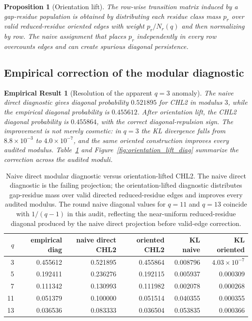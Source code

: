 \documentclass[10pt]{article}
\newtheorem{proposition}{Proposition}
\newtheorem{empirical}{Empirical Result}
\begin{document}
\begin{proposition}[Orientation lift]
The row-wise transition matrix induced by a gap-residue population is obtained by distributing each residue class mass $p_r$ over valid reduced-residue oriented edges with weight $p_r/N_r(q)$ and then normalizing by row.  The naive assignment that places $p_r$ independently in every row overcounts edges and can create spurious diagonal persistence.
\end{proposition}
\subsection{Empirical correction of the modular diagnostic}
\begin{empirical}[Resolution of the apparent $q=3$ anomaly]
The naive direct diagnostic gives diagonal probability $0.521895$ for CHL2 in modulus $3$, while the empirical diagonal probability is $0.455612$.  After orientation lift, the CHL2 diagonal probability is $0.455864$, with the correct diagonal-repulsion sign.  The improvement is not merely cosmetic: in $q=3$ the KL divergence falls from $8.8\times10^{-3}$ to $4.0\times10^{-7}$, and the same oriented construction improves every audited modulus.  Table~\ref{tab:orientation_lift_diag} and Figure~\ref{fig:orientation_lift_diag} summarize the correction across the audited moduli.
\end{empirical}

\begin{table}[H]\centering\small
\begin{tabular}{rrrrrr}
\toprule
$q$ & empirical diag & naive direct CHL2 & oriented CHL2 & KL naive & KL oriented \\
\midrule
3 & 0.455612 & 0.521895 & 0.455864 & 0.008796 & $4.03\times10^{-7}$ \\
5 & 0.192411 & 0.236276 & 0.192115 & 0.005937 & 0.000309 \\
7 & 0.111342 & 0.130993 & 0.111982 & 0.002078 & 0.000268 \\
11 & 0.051379 & 0.100000 & 0.051514 & 0.040355 & 0.000355 \\
13 & 0.036536 & 0.083333 & 0.036504 & 0.053835 & 0.000366 \\
\bottomrule
\end{tabular}
\caption{Naive direct modular diagnostic versus orientation-lifted CHL2.  The naive direct diagnostic is the failing projection; the orientation-lifted diagnostic distributes gap-residue mass over valid directed reduced-residue edges and improves every audited modulus.  The round naive diagonal values for $q=11$ and $q=13$ coincide with $1/(q-1)$ in this audit, reflecting the near-uniform reduced-residue diagonal produced by the naive direct projection before valid-edge correction.}\label{tab:orientation_lift_diag}
\end{table}
\end{document}
